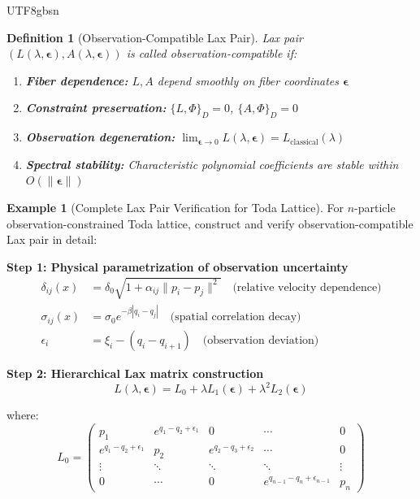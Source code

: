 \documentclass[a4paper,12pt]{extarticle}
\newtheorem{definition}{Definition}
\theoremstyle{definition}
\newtheorem{example}{Example}
\begin{document}
\begin{CJK}{UTF8}{gbsn}
\begin{definition}[Observation-Compatible Lax Pair]
Lax pair $(L(\lambda, \boldsymbol{\epsilon}), A(\lambda, \boldsymbol{\epsilon}))$ is called observation-compatible if:
\begin{enumerate}[label=(\arabic*)]
\item \textbf{Fiber dependence:} $L, A$ depend smoothly on fiber coordinates $\boldsymbol{\epsilon}$
\item \textbf{Constraint preservation:} $\{L, \Phi\}_D = 0$, $\{A, \Phi\}_D = 0$
\item \textbf{Observation degeneration:} $\lim_{\boldsymbol{\epsilon} \to 0} L(\lambda, \boldsymbol{\epsilon}) = L_{\text{classical}}(\lambda)$
\item \textbf{Spectral stability:} Characteristic polynomial coefficients are stable within $O(\|\boldsymbol{\epsilon}\|)$
\end{enumerate}
\end{definition}

\begin{example}[Complete Lax Pair Verification for Toda Lattice]
For $n$-particle observation-constrained Toda lattice, construct and verify observation-compatible Lax pair in detail:

\textbf{Step 1: Physical parametrization of observation uncertainty}
\begin{align*}
\delta_{ij}(x) &= \delta_0 \sqrt{1 + \alpha_{ij} \|p_i - p_j\|^2} \quad \text{(relative velocity dependence)} \\
\sigma_{ij}(x) &= \sigma_0 e^{-\beta|q_i - q_j|} \quad \text{(spatial correlation decay)} \\
\epsilon_i &= \xi_i - (q_i - q_{i+1}) \quad \text{(observation deviation)}
\end{align*}

\textbf{Step 2: Hierarchical Lax matrix construction}
$$L(\lambda, \boldsymbol{\epsilon}) = L_0 + \lambda L_1(\boldsymbol{\epsilon}) + \lambda^2 L_2(\boldsymbol{\epsilon})$$

where:
$$L_0 = \begin{pmatrix}
p_1 & e^{q_1-q_2+\epsilon_1} & 0 & \cdots & 0 \\
e^{q_1-q_2+\epsilon_1} & p_2 & e^{q_2-q_3+\epsilon_2} & \cdots & 0 \\
\vdots & \ddots & \ddots & \ddots & \vdots \\
0 & \cdots & 0 & e^{q_{n-1}-q_n+\epsilon_{n-1}} & p_n
\end{pmatrix}$$


\end{example}
\end{CJK}
\end{document}

